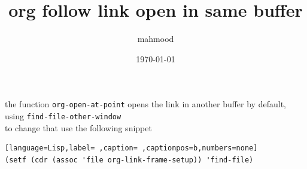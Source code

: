 \documentclass[a4paper,12pt]{article}
\author{mahmood}
\date{\today}
\title{org follow link open in same buffer}
\begin{document}
\maketitle
the function \texttt{org-open-at-point} opens the link in another buffer by default, using \texttt{find-file-other-window}\\[0pt]
to change that use the following snippet\\[0pt]
\begin{lstlisting}[language=Lisp,label= ,caption= ,captionpos=b,numbers=none]
(setf (cdr (assoc 'file org-link-frame-setup)) 'find-file)
\end{lstlisting}
\end{document}
